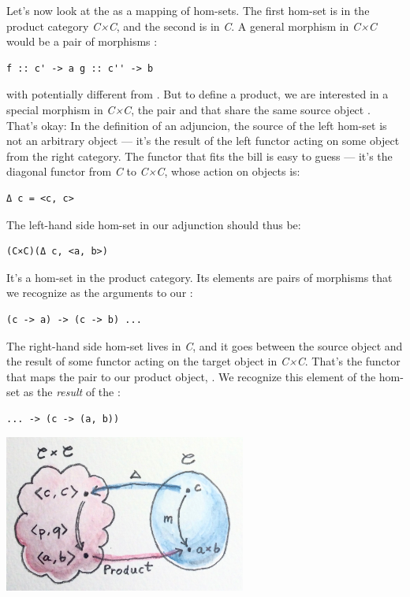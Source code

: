 Let's now look at the  as a mapping of hom-sets. The
first hom-set is in the product category \emph{C×C}, and the second is
in \emph{C}. A general morphism in \emph{C×C} would be a pair of
morphisms :

\begin{verbatim}
f :: c' -> a g :: c'' -> b
\end{verbatim}

with  potentially different from
. But to define a product, we are interested in a
special morphism in \emph{C×C}, the pair  and  that
share the same source object . That's okay: In the definition
of an adjuncion, the source of the left hom-set is not an arbitrary
object --- it's the result of the left functor  acting on some
object from the right category. The functor that fits the bill is easy
to guess --- it's the diagonal functor from \emph{C} to \emph{C×C},
whose action on objects is:

\begin{verbatim}
Δ c = <c, c>
\end{verbatim}

The left-hand side hom-set in our adjunction should thus be:

\begin{verbatim}
(C×C)(Δ c, <a, b>)
\end{verbatim}

It's a hom-set in the product category. Its elements are pairs of
morphisms that we recognize as the arguments to our :

\begin{verbatim}
(c -> a) -> (c -> b) ...
\end{verbatim}

The right-hand side hom-set lives in \emph{C}, and it goes between the
source object  and the result of some functor 
acting on the target object in \emph{C×C}. That's the functor that maps
the pair  to our product object,
. We recognize this element of the hom-set as the
\emph{result} of the :

\begin{verbatim}
... -> (c -> (a, b))
\end{verbatim}

\includegraphics[width=3.12500in]{images/adj-product.jpg}

